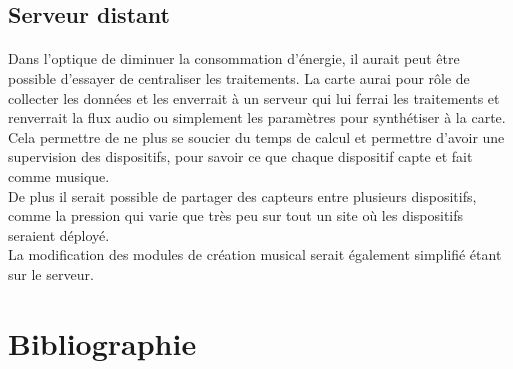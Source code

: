 \documentclass[a4paper, titlepage, oneside, 12pt]{article}%
\begin{document}
\subsection{Serveur distant}
\paragraph{}
Dans l'optique de diminuer la consommation d’énergie, il aurait peut être possible d'essayer de centraliser les traitements. La carte aurai pour rôle de collecter les données et les enverrait à un serveur qui lui ferrai les traitements et renverrait la flux audio ou simplement les paramètres pour synthétiser à la carte.\\
Cela permettre de ne plus se soucier du temps de calcul et permettre d'avoir une supervision des dispositifs, pour savoir ce que chaque dispositif capte et fait comme musique.\\
De plus il serait possible de partager des capteurs entre plusieurs dispositifs, comme la pression qui varie que très peu sur tout un site où les dispositifs seraient déployé.\\
La modification des modules de création musical serait également simplifié étant sur le serveur.


\newpage
\section{Bibliographie}
\nocite{*}


\end{document}
